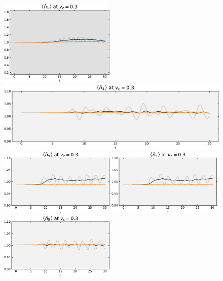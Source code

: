 \begin{figure}[!hbt]
{{\begin{minipage}[b]{.59\textwidth}
                \includegraphics[trim=0 0 0 -4, clip, width=0.49\textwidth]{graph/occupation/occupation_site_1_vc_03.pdf}
                \includegraphics[trim=0 0 0 -4, clip, width=1.00\textwidth]{graph/occupation/occupation_site_4_vc_03.pdf}
                \includegraphics[trim=0 0 0 -4, clip, width=0.49\textwidth]{graph/occupation/occupation_site_9_vc_03.pdf}
                \includegraphics[trim=0 0 0 -4, clip, width=0.49\textwidth]{graph/occupation/occupation_site_5_vc_03.pdf}
                \includegraphics[trim=0 0 0 -4, clip, width=0.49\textwidth]{graph/occupation/occupation_site_8_vc_03.pdf}

\end{minipage}}}
\end{figure}
